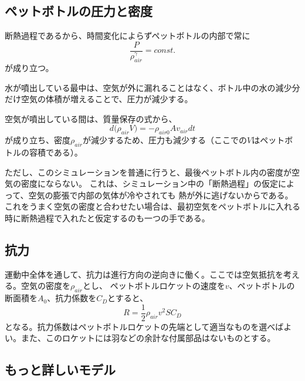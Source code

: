 \documentclass{article}
\begin{document}
\subsection{ ペットボトルの圧力と密度 }

断熱過程であるから、時間変化によらずペットボトルの内部で常に
\begin{equation}
\frac{P}{\rho_{air}^\gamma} = const.
\end{equation}
が成り立つ。

水が噴出している最中は、空気が外に漏れることはなく、ボトル中の水の減少分だけ空気の体積が増えることで、圧力が減少する。

空気が噴出している間は、質量保存の式から、
\begin{equation}
d ({\rho_{air}V)} = - \rho_{air0} A v_{air} dt
\end{equation}
が成り立ち、密度$\rho_{air}$が減少するため、圧力も減少する（ここでの$V$はペットボトルの容積である）。

ただし、このシミュレーションを普通に行うと、最後ペットボトル内の密度が空気の密度にならない。
これは、シミュレーション中の「断熱過程」の仮定によって、空気の膨張で内部の気体が冷やされても
熱が外に逃げないからである。
これをうまく空気の密度と合わせたい場合は、最初空気をペットボトルに入れる時に断熱過程で入れたと仮定するのも一つの手である。

\subsection{ 抗力 }

運動中全体を通して、抗力は進行方向の逆向きに働く。ここでは空気抵抗を考える。空気の密度を$\rho_{air}$とし、
ペットボトルロケットの速度を$v$、ペットボトルの断面積を$A_0$、抗力係数を$C_D$とすると、
\begin{equation}
R = \frac{1}{2}\rho_{air}v^2 S C_D
\end{equation}
となる。抗力係数はペットボトルロケットの先端として適当なものを選べばよい。また、このロケットには羽などの余計な付属部品はないものとする。

\subsection{ もっと詳しいモデル }
\end{document}
